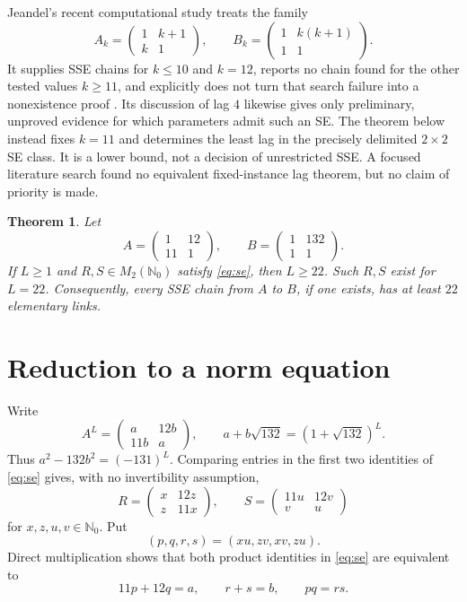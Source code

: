 \documentclass[11pt]{article}
\newtheorem{theorem}{Theorem}
\newcommand{\NN}{\mathbb N_0}
\begin{document}
Jeandel's recent computational study treats the family
\[
A_k=\begin{pmatrix}1&k+1\\k&1\end{pmatrix},\qquad
B_k=\begin{pmatrix}1&k(k+1)\\1&1\end{pmatrix}.
\]
It supplies SSE chains for $k\leq10$ and $k=12$, reports no chain found for
the other tested values $k\geq11$, and explicitly does not turn that search
failure into a nonexistence proof \cite[Problem~3 and Theorem~2]{Jeandel2026}.  Its discussion
of lag $4$ likewise gives only preliminary, unproved evidence for which
parameters admit such an SE.  The theorem below instead fixes $k=11$ and
determines the least lag in the precisely delimited $2\times2$ SE class.  It is
a lower bound, not a decision of unrestricted SSE.  A focused literature
search found no equivalent fixed-instance lag theorem, but no claim of
priority is made.

\begin{theorem}\label{thm:main}
Let
\[
A=\begin{pmatrix}1&12\\11&1\end{pmatrix},\qquad
B=\begin{pmatrix}1&132\\1&1\end{pmatrix}.
\]
If $L\geq1$ and $R,S\in M_2(\NN)$ satisfy \eqref{eq:se}, then $L\geq22$.
Such $R,S$ exist for $L=22$.  Consequently, every SSE chain from $A$ to $B$,
if one exists, has at least $22$ elementary links.
\end{theorem}

\section{Reduction to a norm equation}

Write
\begin{equation}\label{eq:power}
A^L=\begin{pmatrix}a&12b\\11b&a\end{pmatrix},\qquad
a+b\sqrt{132}=(1+\sqrt{132})^L.
\end{equation}
Thus $a^2-132b^2=(-131)^L$.  Comparing entries in the first two identities
of \eqref{eq:se} gives, with no invertibility assumption,
\begin{equation}\label{eq:forms}
R=\begin{pmatrix}x&12z\\z&11x\end{pmatrix},\qquad
S=\begin{pmatrix}11u&12v\\v&u\end{pmatrix}
\end{equation}
for $x,z,u,v\in\NN$.  Put
\[
(p,q,r,s)=(xu,zv,xv,zu).
\]
Direct multiplication shows that both product identities in \eqref{eq:se}
are equivalent to
\begin{equation}\label{eq:scalar}
11p+12q=a,\qquad r+s=b,\qquad pq=rs.
\end{equation}
\end{document}
